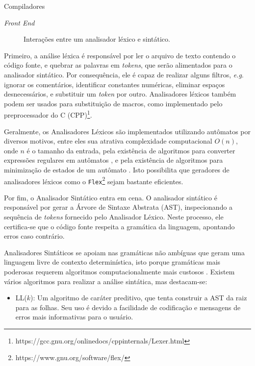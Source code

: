 \begin{section}{Compiladores}
\begin{subsection}{\textit{Front End}}
\begin{figure}
\begin{center}
{
}
\end{center}

\caption{Interações entre um analisador léxico e sintático.}
\label{fig:lexico_sintatico}
\end{figure}

    Primeiro, a análise léxica é responsável por ler o arquivo
de texto contendo o código fonte, e quebrar as palavras em \textit{tokens}, que
serão alimentados para o analisador sintático. Por consequência, ele é capaz de
realizar alguns filtros, \textit{e.g}. ignorar os comentários, identificar constantes
numéricas, eliminar espaços desnecessários, e substituir um \textit{token} por
outro.
Analisadores léxicos também podem ser usados para substituição
de macros, como implementado pelo preprocessador do C
(CPP)\footnote{https://gcc.gnu.org/onlinedocs/cppinternals/Lexer.html}.

Geralmente, os Analisadores Léxicos são implementados utilizando autômatos
por diversos motivos, entre eles sua atrativa complexidade computacional
$O(n)$, onde $n$ é o tamanho da entrada, pela existência de algoritmos
para converter expressões regulares em autômatos \citep{thompson}, e pela
existência de algoritmos para minimização de estados de um autômato
\citep{hopcroft1971n}. Isto possibilita que geradores de analisadores léxicos
como o \texttt{Flex}\footnote{https://www.gnu.org/software/flex/}
sejam bastante eficientes.

    Por fim, o Analisador Sintático entra em cena. O analisador sintático é
responsável por gerar a Árvore de Sintaxe Abstrata (AST), inspecionando a
sequência de \textit{tokens} fornecido pelo Analisador Léxico. Neste processo,
ele certifica-se que o código fonte respeita a gramática da linguagem,
apontando erros caso contrário.

    Analisadores Sintáticos se apoiam nas gramáticas não ambíguas que geram uma
linguagem livre de contexto determinística, isto porque gramáticas mais
poderosas requerem algoritmos computacionalmente mais custosos
\citep{sipser2012}. Existem vários algoritmos para realizar a análise sintática,
mas destacam-se:
\begin{itemize}
    \item LL($k$): Um algoritmo de caráter preditivo, que tenta construir a AST da
        raiz para as folhas. Seu uso é devido a facilidade de codificação e
        mensagens de erros mais informativas para o usuário.


\end{itemize}
\end{subsection}
\end{section}
